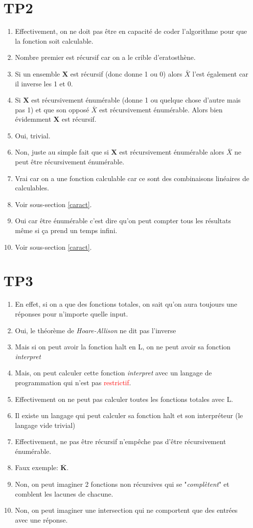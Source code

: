 \documentclass{report}
\begin{document}
\section{TP2}
\begin{enumerate}
\item Effectivement, on ne doit pas être en capacité de coder l'algorithme pour que la fonction soit calculable.
\item Nombre premier est récursif car on a le crible d'eratosthène.
\item Si un ensemble $\textbf{X}$ est récursif (donc donne 1 ou 0) alors $\bar{X}$ l'est également car il inverse les 1 et 0.
\item Si $\textbf{X}$ est récursivement énumérable (donne 1 ou quelque chose d'autre mais pas 1) et que son opposé $\bar{X}$ est récursivement énumérable. Alors bien évidemment $\textbf{X}$ est récursif.
\item Oui, trivial.
\item Non, juste au simple fait que si $\textbf{X}$ est récursivement énumérable alors $\bar{X}$ ne peut être récursivement énumérable.
\item Vrai car on a une fonction calculable car ce sont des combinaisons linéaires de calculables.
\item Voir sous-section \ref{caract}.
\item Oui car être énumérable c'est dire qu'on peut compter tous les résultats même si ça prend un temps infini.
\item Voir sous-section \ref{caract}.
\end{enumerate}

\section{TP3}
\begin{enumerate}
\item En effet, si on a que des fonctions totales, on sait qu'on aura toujours une réponses pour n'importe quelle input.
\item Oui, le théorème de \textit{Hoare-Allison} ne dit pas l'inverse
\item Mais si on peut avoir la fonction halt en L, on ne peut avoir sa fonction \textit{interpret}
\item Mais, on peut calculer cette fonction \textit{interpret} avec un langage de programmation qui n'est pas \textcolor{red}{restrictif}.
\item Effectivement on ne peut pas calculer toutes les fonctions totales avec L.
\item Il existe un langage qui peut calculer sa fonction halt et son interpréteur (le langage vide trivial)
\item Effectivement, ne pas être récursif n'empêche pas d'être récursivement énumérable.
\item Faux exemple: $\overline{\textbf{K}}$.
\item Non, on peut imaginer 2 fonctions non récursives qui se "\textit{complètent}" et comblent les lacunes de chacune.
\item Non, on peut imaginer une intersection qui ne comportent que des entrées avec une réponse.
\end{enumerate}
\end{document}
